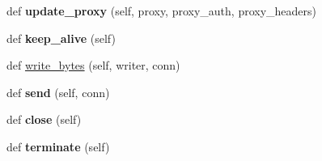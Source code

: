 \begin{DoxyCompactItemize}
\mbox{\label{classaiohttp_1_1client__reqrep_1_1_client_request_a2174465e3e6cd84f6f54b95e1aef9b31}} 
def {\bfseries update\+\_\+proxy} (self, proxy, proxy\+\_\+auth, proxy\+\_\+headers)
\item 
\mbox{\label{classaiohttp_1_1client__reqrep_1_1_client_request_a284d336f84f74addc78c51de53314931}} 
def {\bfseries keep\+\_\+alive} (self)
\item 
def \hyperlink{classaiohttp_1_1client__reqrep_1_1_client_request_a7514dbf7e2978859fab260c804fe52c9}{write\+\_\+bytes} (self, writer, conn)
\item 
\mbox{\label{classaiohttp_1_1client__reqrep_1_1_client_request_ae50c863469f4c12497cc69680aa9ea6f}} 
def {\bfseries send} (self, conn)
\item 
\mbox{\label{classaiohttp_1_1client__reqrep_1_1_client_request_a83b426aaf2e800b222909971125d6526}} 
def {\bfseries close} (self)
\item 
\mbox{\label{classaiohttp_1_1client__reqrep_1_1_client_request_a5ef798b9ef8d9947ab91eeb030c4745e}} 
def {\bfseries terminate} (self)
\end{DoxyCompactItemize}

